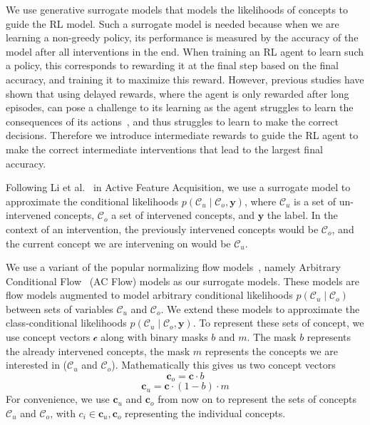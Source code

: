 We use generative surrogate models that models the likelihoods of concepts
to guide the RL model. 
Such a surrogate model is needed because
when we are learning
a non-greedy policy, its performance is measured by the accuracy
of the model after all interventions in the end.
When training an RL agent to learn such a policy, this corresponds
to rewarding it at the final step based 
on the final accuracy, and training it to maximize this reward.
However, previous studies have shown that
using delayed rewards, where the agent is only rewarded after long episodes,
can pose a challenge to its learning as the agent struggles to learn
the consequences of its actions~\cite{ steps-towards-ai, temporal-credit-assignment},
and thus struggles to learn to make the correct decisions.
Therefore we introduce intermediate rewards 
to guide the RL agent to make the correct intermediate
interventions that lead 
to the largest final accuracy.

Following Li et al.~\cite{afa} in Active Feature Acquisition,
we use a surrogate model 
to approximate
the conditional likelihoods $p(\mathcal{C}_u \mid \mathcal{C}_o, \mathbf{y})$, 
where $\mathcal{C}_u$ is a set of un-intervened
concepts, $\mathcal{C}_o$ a set of intervened concepts,
and $\mathbf{y}$ the label. 
In the context of an intervention, the previously intervened concepts would be $\mathcal{C}_o$,
and the current concept we are intervening on would be
$\mathcal{C}_u$.

We use a variant of the popular normalizing flow models~\cite{normalizing-flows},
namely Arbitrary Conditional Flow~\cite{acflow} (AC Flow)
models as our surrogate models.
These models are 
flow models augmented to model arbitrary conditional likelihoods $p(\mathcal{C}_u \mid \mathcal{C}_o)$
between sets of variables $\mathcal{C}_u$ and $\mathcal{C}_o$.
We extend these models to approximate the class-conditional
likelihoods
$p(\mathcal{C}_u \mid \mathcal{C}_o, \mathbf{y})$. To represent
these sets of concept,
we use concept vectors $\mathcal{c}$ along with
binary masks $b$ and $m$.
The mask $b$ represents
the already intervened concepts, the mask $m$ represents
the concepts we are interested in ($\mathcal{C}_u$ and $\mathcal{C}_o$).
Mathematically this gives us two concept vectors
\[\mathbf{c}_o = \mathbf{c} \cdot b\]
\[\mathbf{c}_u = \mathbf{c} \cdot (1 - b) \cdot m\]
For convenience, we use $\mathbf{c}_u$ and $\mathbf{c}_o$ from now on
to represent the sets of concepts $\mathcal{C}_u$ and $\mathcal{C}_o$, with
$c_i \in \mathbf{c}_u, \mathbf{c}_o$ representing the individual concepts.

